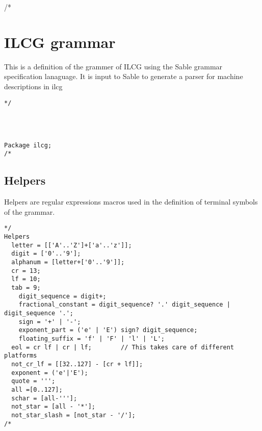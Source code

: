 /*
\section{ILCG grammar}
This is a definition of the grammer of ILCG using the Sable grammar specification
lanaguage. It is input to Sable to generate a parser for machine descriptions in
ilcg


\begin{verbatim}
*/




Package ilcg;
/*\end{verbatim}
\subsection{Helpers}
Helpers are regular expressions macros used in the definition of terminal symbols of the grammar.
\begin{verbatim}*/
Helpers
  letter = [['A'..'Z']+['a'..'z']];
  digit = ['0'..'9'];
  alphanum = [letter+['0'..'9']];
  cr = 13;
  lf = 10;
  tab = 9;
    digit_sequence = digit+;
    fractional_constant = digit_sequence? '.' digit_sequence | digit_sequence '.';
    sign = '+' | '-';
    exponent_part = ('e' | 'E') sign? digit_sequence;
    floating_suffix = 'f' | 'F' | 'l' | 'L';
  eol = cr lf | cr | lf;        // This takes care of different platforms
  not_cr_lf = [[32..127] - [cr + lf]];
  exponent = ('e'|'E');
  quote = ''';
  all =[0..127];
  schar = [all-'''];
  not_star = [all - '*'];
  not_star_slash = [not_star - '/'];
/*\end{verbatim}
